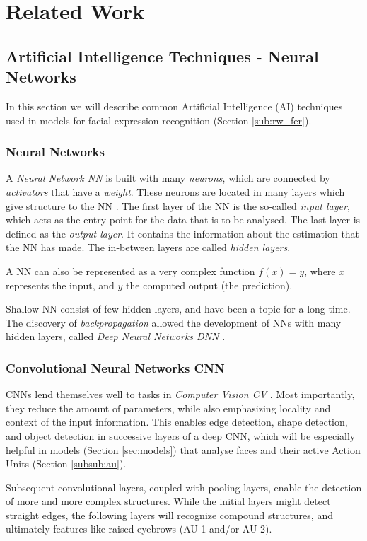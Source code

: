 \section{Related Work}
\label{sec:related}
\subsection{Artificial Intelligence Techniques - Neural Networks}
\label{sub:aiml}
In this section we will describe common Artificial Intelligence (AI) techniques used in models for  facial expression recognition (Section \ref{sub:rw_fer}).
\subsubsection{Neural Networks}
A \emph{Neural Network NN} is built with many \emph{neurons}, which are connected by \emph{activators} that have a \emph{weight}. These neurons are located in many layers which give structure to the NN \cite{schmidhuber2015deep}. The first layer of the NN is the so-called \emph{input layer}, which acts as the entry point for the data that is to be analysed. The last layer is defined as the \emph{output layer}. It contains the information about the estimation that the NN has made. The in-between layers are called \emph{hidden layers}.

A NN can also be represented as a very complex function $f(x) = y$, where $x$ represents the input, and $y$ the computed output (the prediction).

Shallow NN consist of few hidden layers, and have been a topic for a long time. The discovery of \emph{backpropagation} allowed the development of NNs with many hidden layers, called \emph{Deep Neural Networks DNN} \cite{schmidhuber2015deep}.

\subsubsection{Convolutional Neural Networks CNN}
CNNs lend themselves well to tasks in \emph{Computer Vision CV} \cite{albawi2017understanding}. Most importantly, they reduce the amount of parameters, while also emphasizing locality and context of the input information. This enables edge detection, shape detection, and object detection in successive layers of a deep CNN, which will be especially helpful in models (Section \ref{sec:models}) that analyse faces and their active Action Units (Section \ref{subsub:au}).

Subsequent convolutional layers, coupled with pooling layers, enable the detection of more and more complex structures. While the initial layers might detect straight edges, the following layers will recognize compound structures, and ultimately features like raised eyebrows (AU 1 and/or AU 2).


